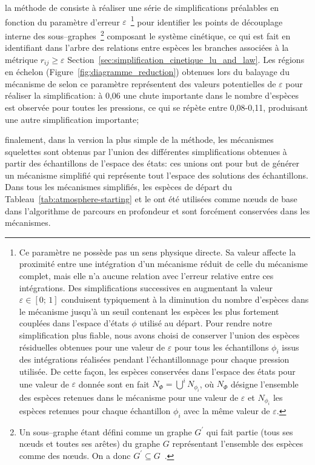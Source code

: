 \begin{description}[style=unboxed, leftmargin=0cm]
\item[balayage:] la méthode de \citet{Lu2005} consiste à réaliser une série de simplifications préalables en fonction du paramètre d'erreur $\varepsilon$~\footnote{Ce paramètre ne possède pas un sens physique directe. Sa valeur affecte la proximité entre une intégration d'un mécanisme réduit de celle du mécanisme complet, mais elle n'a aucune relation avec l'erreur relative entre ces intégrations. Des simplifications successives en augmentant la valeur $\varepsilon\in\left[0;\,1\right]$ conduisent typiquement à la diminution du nombre d'espèces dans le mécanisme jusqu'à un seuil contenant les espèces les plus fortement couplées dans l'espace d'états $\phi$ utilisé au départ. Pour rendre notre simplification plus fiable, nous avons choisi de conserver l'union des espèces résiduelles obtenues pour une valeur de $\varepsilon$ pour tous les échantillons $\phi_{i}$ issus des intégrations réalisées pendant l'échantillonnage pour chaque pression utilisée. De cette façon, les espèces conservées dans l'espace des états pour une valeur de $\varepsilon$ donnée sont en fait $N_{\Phi}=\bigcup^{i}N_{\phi_{i}}$, où $N_{\Phi}$ désigne l'ensemble des espèces retenues dans le mécanisme pour une valeur de $\varepsilon$ et $N_{\phi_{i}}$ les espèces retenues pour chaque échantillon $\phi_{i}$ avec la même valeur de $\varepsilon$.} pour identifier les points de découplage interne des sous--graphes~\footnote{Un sous--graphe étant défini comme un graphe $G^{\prime}$ qui fait partie (tous ses n{\oe}uds et toutes ses arêtes) du graphe $G$ représentant l'ensemble des espèces comme des n{\oe}uds. On a donc $G^{\prime}\subseteq{}G$~\cite{Diestel2000}.} composant le système cinétique, ce qui est fait en identifiant dans l'arbre des relations entre espèces les branches associées à la métrique $r_{ij}\geq{}\varepsilon$ \textemdash{} Section~\ref{sec:simplification_cinetique_lu_and_law}. Les régions en échelon (Figure~\ref{fig:diagramme_reduction}) obtenues lors du balayage du mécanisme de \citet{Norinaga2009} selon ce paramètre représentent des valeurs potentielles de $\varepsilon$ pour réaliser la simplification: à 0,06 une chute importante dans le nombre d'espèces est observée pour toutes les pressions, ce qui se répète entre 0,08-0,11, produisant une autre simplification importante; 

\item[composition:] finalement, dans la version la plus simple de la méthode, les mécanismes squelettes sont obtenus par l'union des différentes simplifications obtenues à partir des échantillons de l'espace des états: ces unions ont pour but de générer un mécanisme simplifié qui représente tout l'espace des solutions des échantillons. Dans tous les mécanismes simplifiés, les espèces de départ du Tableau~\ref{tab:atmosphere-starting} et le  ont été utilisées comme n{\oe}uds de base dans l'algorithme de parcours en profondeur et sont forcément conservées dans les mécanismes.
\end{description}

